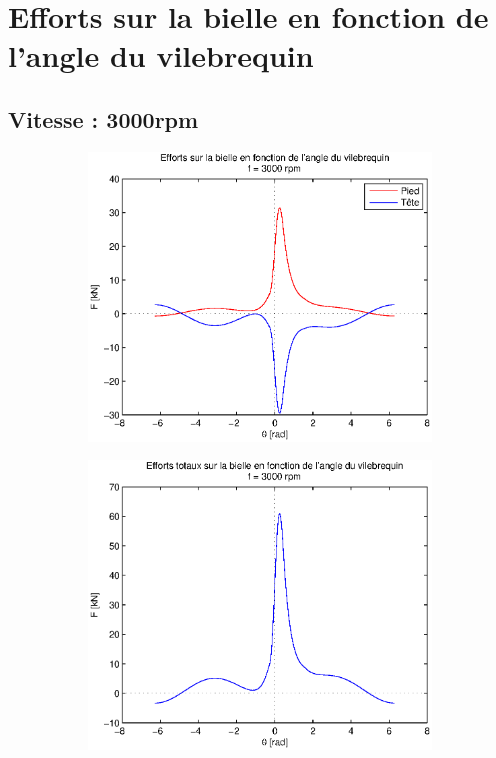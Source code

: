 \documentclass{article}
\begin{document}
\section{Efforts sur la bielle en fonction de l'angle du vilebrequin}

\subsection{Vitesse : \unit{3000}{rpm}}
\begin{figure}
\centering
    \begin{subfigure}[b]{0.45\textwidth}
    \includegraphics[scale=0.5]{Schema/forces_3000rpm.eps}
                \caption{}
                \label{fig:forces_3000rpm}
    \end{subfigure}
    \begin{subfigure}[b]{0.45\textwidth}
                \includegraphics[scale=0.5]{Schema/forces_tot_3000rpm.eps}
                \caption{}
                \label{fig:forces_tot_3000rpm}
    \end{subfigure}
\end{figure}
\end{document}
